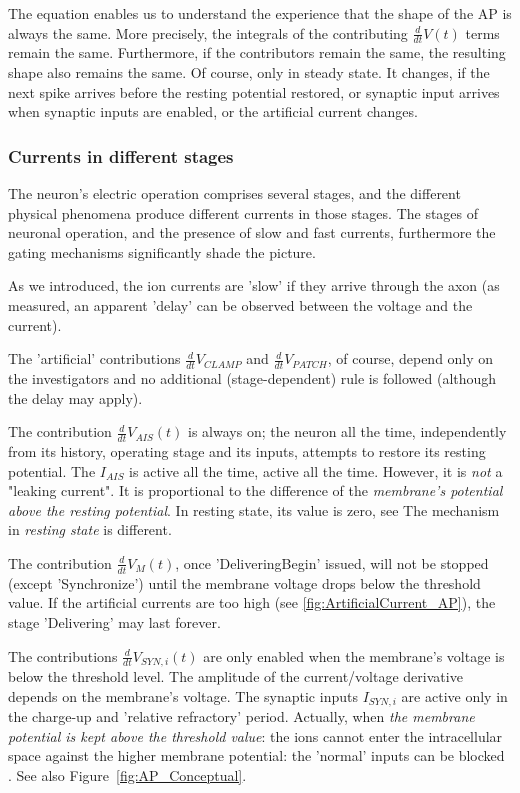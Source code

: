 The equation enables us to understand the experience that the shape of the 
AP is always the same. More precisely, the integrals of the contributing $\frac{d}{dt}V(t)$ terms remain the same. Furthermore, if the contributors remain the same, the resulting shape also remains the same. Of course, only in steady state. It changes, if the next spike arrives before the resting potential restored, or synaptic input arrives when synaptic inputs are enabled, or the artificial current changes.



\subsubsection{Currents in different stages\label{MODELING_SINGLE_ELECTRIC_STAGES}}

The neuron's electric operation comprises several stages, and the different physical phenomena
produce different currents in those stages.
The stages of neuronal
operation, and the presence of slow and fast currents, furthermore
the gating mechanisms significantly shade the picture.

As we introduced, the ion currents are 'slow' if they arrive through the axon
(as~\cite{HodgkinHuxley:1952} measured, an apparent 'delay'
can be observed between the voltage and the current).

The 'artificial' contributions $\frac{d}{dt} V_{CLAMP}$ and $\frac{d}{dt} V_{PATCH}$,
of course, depend only on the investigators and no additional (stage-dependent) rule is followed (although the delay may apply).

The contribution $\frac{d}{dt} V_{AIS}(t)$ is always on; the neuron all the time,
independently from its history, operating stage and its inputs, attempts to restore its resting potential.
The $I_{AIS}$ is active all the time, active all the time. However, it is \textit{not} a "leaking current". It is proportional to the difference
of the \textit{membrane's potential above the resting potential}. In resting state, its value is zero, see  The mechanism in \textit{resting state} is different.



The contribution $\frac{d}{dt} V_{M}(t)$, once 'DeliveringBegin' issued, will not be stopped
(except 'Synchronize') until the membrane voltage drops below the threshold value.
If the artificial currents are too high (see \ref{fig:ArtificialCurrent_AP}), the stage 'Delivering' may last forever.

The contributions $\frac{d}{dt} V_{SYN,i}(t)$ are only enabled
when the membrane's voltage is below the threshold level.
The amplitude of the current/voltage derivative depends
on the membrane's voltage.
The synaptic inputs $I_{SYN,i}$  are  active only in the charge-up
and 'relative refractory' period. Actually, when \textit{the membrane potential
is kept above the threshold value}: the ions cannot enter the intracellular space
against the higher membrane potential: the 'normal' inputs can be blocked \cite{DepolarizationBianchi:2012}. See also Figure~\ref{fig:AP_Conceptual}.


